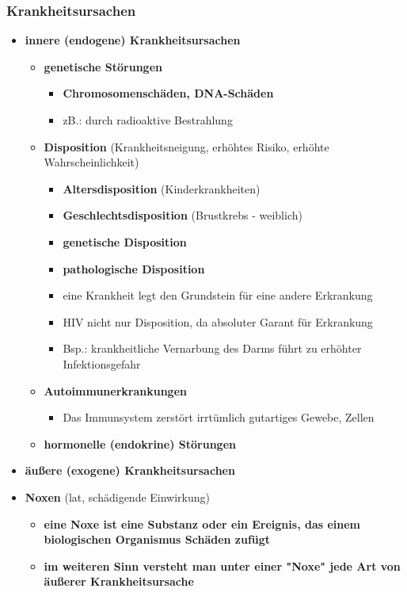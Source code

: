 \subsubsection{Krankheitsursachen}
	\begin{itemize}
		\item \textbf{innere (endogene) Krankheitsursachen}
			\begin{itemize}
				\item \textbf{genetische Störungen}
					\begin{itemize}
						\item \textbf{Chromosomenschäden, DNA-Schäden}
						\item zB.: durch radioaktive Bestrahlung
					\end{itemize}
				\item \textbf{Disposition} (Krankheitsneigung, erhöhtes Risiko, erhöhte Wahrscheinlichkeit)
					\begin{itemize}
						\item \textbf{Altersdisposition} (Kinderkrankheiten)
						\item \textbf{Geschlechtsdisposition} (Brustkrebs - weiblich)
						\item \textbf{genetische Disposition}
						\item \textbf{pathologische Disposition}
						\item eine Krankheit legt den Grundstein für eine andere Erkrankung
						\item HIV nicht nur Disposition, da absoluter Garant für Erkrankung
						\item Bsp.: krankheitliche Vernarbung des Darms führt zu erhöhter Infektionsgefahr 
					\end{itemize}
				\item \textbf{Autoimmunerkrankungen}
					\begin{itemize}
						\item Das Immunsystem zerstört irrtümlich gutartiges Gewebe, Zellen
					\end{itemize}
				\item \textbf{hormonelle (endokrine) Störungen}
			\end{itemize}
		\item \textbf{äußere (exogene) Krankheitsursachen}
		\item \textbf{Noxen} (lat, schädigende Einwirkung)
			\begin{itemize}
				\item \textbf{eine Noxe ist eine Substanz oder ein Ereignis, das einem biologischen Organismus Schäden zufügt}
				\item \textbf{im weiteren Sinn versteht man unter einer "Noxe" jede Art von äußerer Krankheitsursache}
			\end{itemize}
	\end{itemize}
\pagebreak
